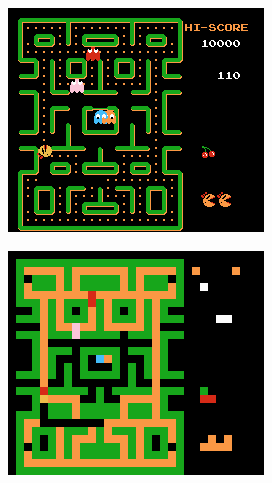 \documentclass[12pt,journal,compsoc]{IEEEtran}
\begin{document}
\begin{figure}
\centering
\begin{minipage}{.25\textwidth}
  \centering
  \includegraphics[width=.95\linewidth]{Original2.png}
  \label{fig:test1}
\end{minipage}%
\begin{minipage}{.25\textwidth}
  \centering
  \includegraphics[width=.95\linewidth]{pixel2.png}
  \label{fig:test2}
\end{minipage}
\end{figure}
\end{document}
